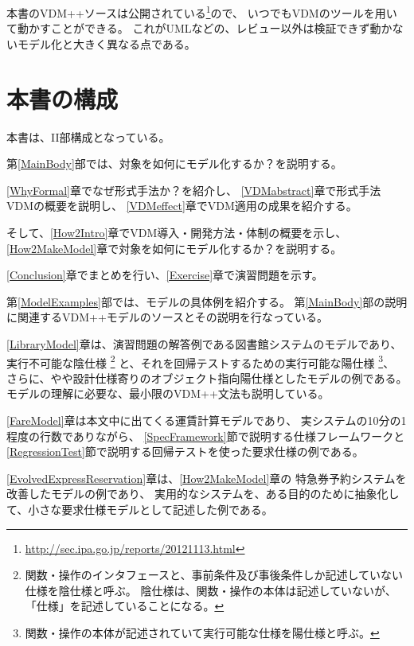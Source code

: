 	本書のVDM++ソースは公開されている\footnote{\url{http://sec.ipa.go.jp/reports/20121113.html}}ので、
	いつでもVDMのツールを用いて動かすことができる。
	これがUMLなどの、レビュー以外は検証できず動かないモデル化と大きく異なる点である。

\section {本書の構成}

	本書は、I\hspace{-.1em}I部構成となっている。

	第\ref{MainBody}部では、対象を如何にモデル化するか？を説明する。

	\ref{WhyFormal}章でなぜ形式手法か？を紹介し、
	\ref{VDMabstract}章で形式手法VDMの概要を説明し、
	\ref{VDMeffect}章でVDM適用の成果を紹介する。

	そして、\ref{How2Intro}章でVDM導入・開発方法・体制の概要を示し、
	\ref{How2MakeModel}章で対象を如何にモデル化するか？を説明する。

	\ref{Conclusion}章でまとめを行い、\ref{Exercise}章で演習問題を示す。

	第\ref{ModelExamples}部では、モデルの具体例を紹介する。
	第\ref{MainBody}部の説明に関連するVDM++モデルのソースとその説明を行なっている。

	\ref{LibraryModel}章は、演習問題の解答例である図書館システムのモデルであり、
	実行不可能な陰仕様
		\footnote{関数・操作のインタフェースと、事前条件及び事後条件しか記述していない仕様を陰仕様と呼ぶ。
		陰仕様は、関数・操作の本体は記述していないが、「仕様」を記述していることになる。}
	と、それを回帰テストするための実行可能な陽仕様
		\footnote{関数・操作の本体が記述されていて実行可能な仕様を陽仕様と呼ぶ。}、
	さらに、やや設計仕様寄りのオブジェクト指向陽仕様としたモデルの例である。
	モデルの理解に必要な、最小限のVDM++文法も説明している。

	\ref{FareModel}章は本文中に出てくる運賃計算モデルであり、
	実システムの10分の1程度の行数でありながら、
	\ref{SpecFramework}節で説明する仕様フレームワークと
	\ref{RegressionTest}節で説明する回帰テストを使った要求仕様の例である。

	\ref{EvolvedExpressReservation}章は、\ref{How2MakeModel}章の
	特急券予約システムを改善したモデルの例であり、
	実用的なシステムを、ある目的のために抽象化して、小さな要求仕様モデルとして記述した例である。